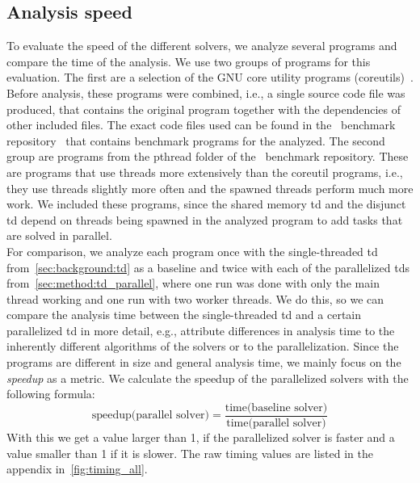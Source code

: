   \subsection{Analysis speed}
  \label{sec:eval:speed}
  To evaluate the speed of the different solvers, we analyze several programs and compare the time of the analysis. We use two groups of programs for this evaluation. The first are a selection of the GNU core utility programs (coreutils)~\cite{gnuCoreutils}. Before analysis, these programs were combined, i.e., a single source code file was produced, that contains the original program together with the dependencies of other included files. The exact code files used can be found in the \gob\ benchmark repository~\cite{goblintBench} that contains benchmark programs for the analyzed.
  The second group are programs from the pthread folder of the \gob\ benchmark repository. These are programs that use threads more extensively than the coreutil programs, i.e., they use threads slightly more often and the spawned threads perform much more work. We included these programs, since the shared memory \ac{td} and the disjunct \ac{td} depend on threads being spawned in the analyzed program to add tasks that are solved in parallel.\\
  For comparison, we analyze each program once with the single-threaded \ac{td} from~\autoref{sec:background:td} as a baseline and twice with each of the parallelized \acp{td} from~\autoref{sec:method:td_parallel}, where one run was done with only the main thread working and one run with two worker threads. We do this, so we can compare the analysis time between the single-threaded \ac{td} and a certain parallelized \ac{td} in more detail, e.g., attribute differences in analysis time to the inherently different algorithms of the solvers or to the parallelization. Since the programs are different in size and general analysis time, we mainly focus on the \textit{speedup} as a metric. We calculate the speedup of the parallelized solvers with the following formula:
  \begin{equation*}
    \text{speedup(parallel solver)} = \frac{\text{time(baseline solver)}}{\text{time(parallel solver)}}
  \end{equation*}
  With this we get a value larger than 1, if the parallelized solver is faster and a value smaller than 1 if it is slower. The raw timing values are listed in the appendix in~\autoref{fig:timing_all}.
